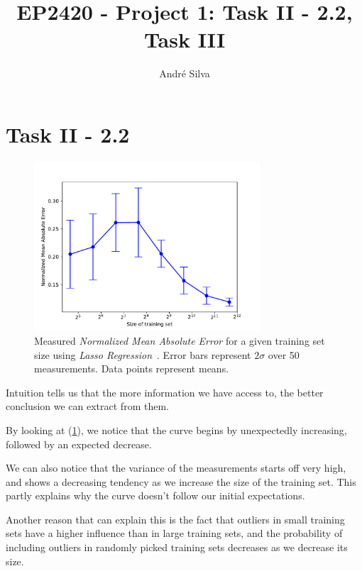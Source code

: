 \documentclass[]{article}
\title{EP2420 - Project 1: Task II - 2.2, Task III}
\author{André Silva}
\begin{document}
\maketitle

\section{\textbf{Task II - 2.2}}
\label{sec:1}

\begin{figure}[h!]
    \centering
    \captionsetup{justification=centering}
    \includegraphics[width=0.75\textwidth,height=\textheight,keepaspectratio]{../result/project1/training_set_size_errors.pdf}
    \caption{Measured \textit{Normalized Mean Absolute Error} for a given training set size using \textit{Lasso Regression}~\cite{Lasso}. Error bars represent $2\sigma$ over 50 measurements. Data points represent means.}
    \label{fig:1}
\end{figure}

Intuition tells us that the more information we have access to, the better conclusion we can extract from them.

By looking at (\ref{fig:1}), we notice that the curve begins by unexpectedly increasing, followed by an expected decrease. 

We can also notice that the variance of the measurements starts off very high, and shows a decreasing tendency as we increase the size of the training set. This partly explains why the curve doesn't follow our initial expectations. 

Another reason that can explain this is the fact that outliers in small training sets have a higher influence than in large training sets, and the probability of including outliers in randomly picked training sets decreases as we decrease its size.
\end{document}
